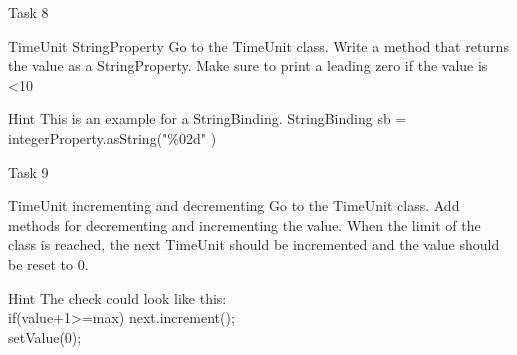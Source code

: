 \begin{frame}{Task 8}
\begin{block}{TimeUnit StringProperty}
Go to the TimeUnit class. Write a method that returns the value as a StringProperty. Make sure to print a leading zero if the value is <10
\end{block}
\pause
\begin{exampleblock}{Hint}
This is an example for a StringBinding.\newline
StringBinding sb = integerProperty.asString("\%02d" )
\end{exampleblock}
\end{frame}
\begin{frame}{Task 9}
\begin{block}{TimeUnit incrementing and decrementing}
Go to the TimeUnit class. Add methods for decrementing and incrementing the value. When the limit of the class is reached, the next TimeUnit should be incremented and the value should be reset to 0.
\end{block}
\pause
\begin{exampleblock}{Hint}
The check could look like this:\\
if(value+1>=max) 
 next.increment();\\
 setValue(0);\\
\end{exampleblock}
\end{frame}

